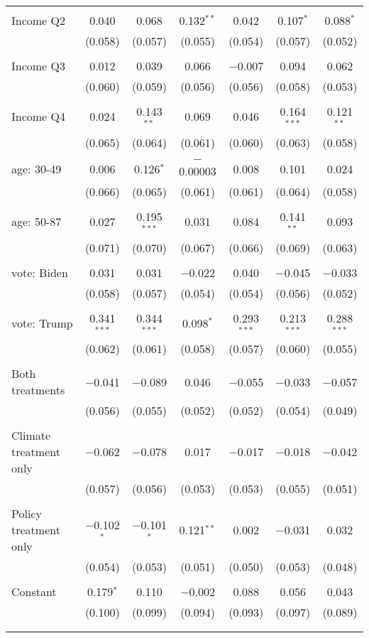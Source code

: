 \begin{tabular}{@{\extracolsep{5pt}}lcccccc}
  & & & & & & \\ 
 Income Q2 & 0.040 & 0.068 & 0.132$^{**}$ & 0.042 & 0.107$^{*}$ & 0.088$^{*}$ \\ 
  & (0.058) & (0.057) & (0.055) & (0.054) & (0.057) & (0.052) \\ 
  & & & & & & \\ 
 Income Q3 & 0.012 & 0.039 & 0.066 & $-$0.007 & 0.094 & 0.062 \\ 
  & (0.060) & (0.059) & (0.056) & (0.056) & (0.058) & (0.053) \\ 
  & & & & & & \\ 
 Income Q4 & 0.024 & 0.143$^{**}$ & 0.069 & 0.046 & 0.164$^{***}$ & 0.121$^{**}$ \\ 
  & (0.065) & (0.064) & (0.061) & (0.060) & (0.063) & (0.058) \\ 
  & & & & & & \\ 
 age: 30-49 & 0.006 & 0.126$^{*}$ & $-$0.00003 & 0.008 & 0.101 & 0.024 \\ 
  & (0.066) & (0.065) & (0.061) & (0.061) & (0.064) & (0.058) \\ 
  & & & & & & \\ 
 age: 50-87 & 0.027 & 0.195$^{***}$ & 0.031 & 0.084 & 0.141$^{**}$ & 0.093 \\ 
  & (0.071) & (0.070) & (0.067) & (0.066) & (0.069) & (0.063) \\ 
  & & & & & & \\ 
 vote: Biden & 0.031 & 0.031 & $-$0.022 & 0.040 & $-$0.045 & $-$0.033 \\ 
  & (0.058) & (0.057) & (0.054) & (0.054) & (0.056) & (0.052) \\ 
  & & & & & & \\ 
 vote: Trump & 0.341$^{***}$ & 0.344$^{***}$ & 0.098$^{*}$ & 0.293$^{***}$ & 0.213$^{***}$ & 0.288$^{***}$ \\ 
  & (0.062) & (0.061) & (0.058) & (0.057) & (0.060) & (0.055) \\ 
  & & & & & & \\ 
 Both treatments & $-$0.041 & $-$0.089 & 0.046 & $-$0.055 & $-$0.033 & $-$0.057 \\ 
  & (0.056) & (0.055) & (0.052) & (0.052) & (0.054) & (0.049) \\ 
  & & & & & & \\ 
 Climate treatment only & $-$0.062 & $-$0.078 & 0.017 & $-$0.017 & $-$0.018 & $-$0.042 \\ 
  & (0.057) & (0.056) & (0.053) & (0.053) & (0.055) & (0.051) \\ 
  & & & & & & \\ 
 Policy treatment only & $-$0.102$^{*}$ & $-$0.101$^{*}$ & 0.121$^{**}$ & 0.002 & $-$0.031 & 0.032 \\ 
  & (0.054) & (0.053) & (0.051) & (0.050) & (0.053) & (0.048) \\ 
  & & & & & & \\ 
 Constant & 0.179$^{*}$ & 0.110 & $-$0.002 & 0.088 & 0.056 & 0.043 \\ 
  & (0.100) & (0.099) & (0.094) & (0.093) & (0.097) & (0.089) \\ 
  & & & & & & \\ 
\hline \\[-1.8ex] 


\end{tabular}
